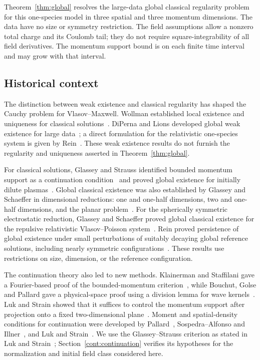 Theorem~\ref{thm:global} resolves the large-data global classical
regularity problem for this one-species model in three spatial and three momentum
dimensions. The data have no size or symmetry restriction. The field
assumptions allow a nonzero total charge and its Coulomb tail;
they do not require square-integrability of all field derivatives.
The momentum support bound is on each finite time interval and may
grow with that interval.

\subsection{Historical context}
The distinction between weak existence and classical regularity has
shaped the Cauchy problem for Vlasov--Maxwell. Wollman established local
existence and uniqueness for classical solutions~\cite{Wollman1984}.
DiPerna and Lions developed global weak existence for large
data~\cite{DiPernaLions1989}; a direct formulation for the relativistic
one-species system is given by Rein~\cite{Rein2004Weak}.
These weak existence results do not furnish the regularity and
uniqueness asserted in Theorem~\ref{thm:global}.

For classical solutions, Glassey and Strauss identified bounded
momentum support as a continuation condition~\cite{GlasseyStrauss1986}
and proved global existence for initially dilute
plasmas~\cite{GlasseyStrauss1987}.
Global classical existence was also established by Glassey and
Schaeffer in dimensional reductions: one and one-half dimensions,
two and one-half dimensions, and the planar
problem~\cite{GlasseySchaeffer1990OneHalf,GlasseySchaeffer1997TwoHalf,
GlasseySchaeffer1998PlanarI,GlasseySchaeffer1998PlanarII}.
For the spherically symmetric electrostatic reduction, Glassey and
Schaeffer proved global classical existence for the repulsive relativistic
Vlasov--Poisson system~\cite{GlasseySchaeffer1985Symmetric}.
Rein proved persistence of global existence under small perturbations
of suitably decaying global reference solutions, including nearly
symmetric configurations~\cite{Rein1990Generic}.
These results use restrictions on size, dimension, or the reference
configuration.

The continuation theory also led to new methods. Klainerman and
Staffilani gave a Fourier-based proof of the bounded-momentum
criterion~\cite{KlainermanStaffilani2002}, while Bouchut, Golse and
Pallard gave a physical-space proof using a division lemma for wave
kernels~\cite{BouchutGolsePallard2003}. Luk and Strain showed that it
suffices to control the momentum support after projection onto a
fixed two-dimensional plane~\cite[Theorem~1.2]{LukStrain2014Continuation}.
Moment and spatial-density conditions for continuation were developed by
Pallard~\cite{Pallard2005,Pallard2015Refined}, Sospedra--Alfonso and
Illner~\cite{SospedraAlfonsoIllner2010}, and Luk and
Strain~\cite{LukStrain2016Moments}.
We use the Glassey--Strauss criterion as stated in Luk and
Strain~\cite[Theorem~1.1]{LukStrain2014Continuation};
Section~\ref{cont:continuation} verifies its hypotheses for the
normalization and initial field class considered here.


